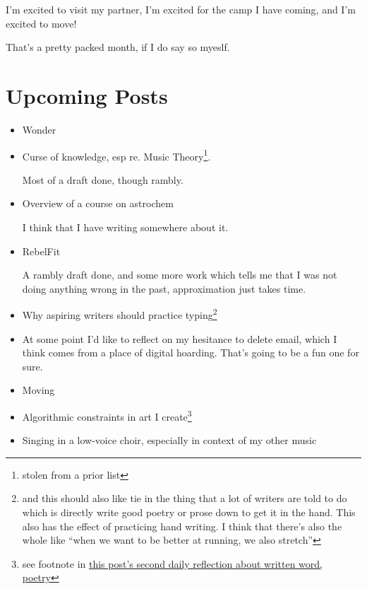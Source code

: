 \documentclass[12pt]{article}
\newcommand{\say}[1]{``#1''}
\renewcommand{\,}{\textsuperscript{,}}
\begin{document}
I'm excited to visit my partner, I'm excited for the camp I have coming, and I'm excited to move!

That's a pretty packed month, if I do say so myeslf.

\section{Upcoming Posts}  
\begin{itemize}

\item Wonder  
\item Curse of knowledge, esp re. Music Theory\footnote{stolen from a prior list}.

Most of a draft done, though rambly.  
\item Overview of a course on astrochem

I think that I have writing somewhere about it.  
\item RebelFit

A rambly draft done, and some more work which tells me that I was not doing anything wrong in the past, approximation just takes time.  
\item Why aspiring writers should practice typing\footnote{and this should also like tie in the thing that a lot of writers are told to do which is directly write good poetry or prose down to get it in the hand. This also has the effect of practicing hand writing. I think that there's also the whole like \say{when we want to be better at running, we also stretch}}

\item At some point I'd like to reflect on my hesitance to delete email, which I think comes from a place of digital hoarding. That's going to be a fun one for sure.

\item Moving

\item Algorithmic constraints in art I create\footnote{see footnote in \href{reflection-june-2026}{this post's second daily reflection about written word, poetry}}

\item Singing in a low-voice choir, especially in context of my other music

\end{itemize}
\end{document}
